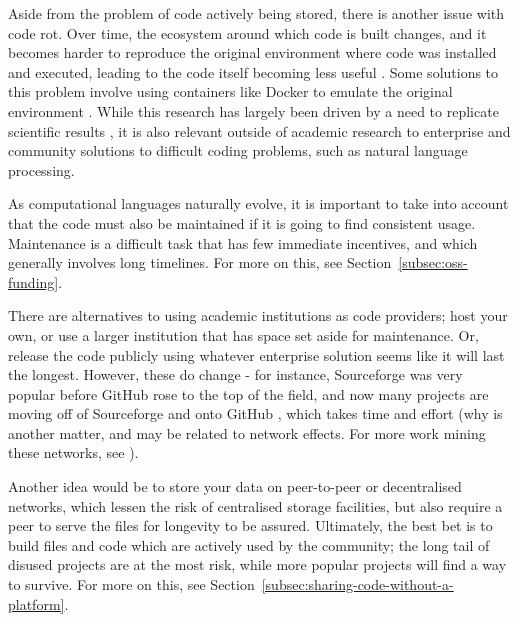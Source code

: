 Aside from the problem of code actively being stored, there is another issue with code rot. Over time, the ecosystem around which code is built changes, and it becomes harder to reproduce the original environment where code was installed and executed, leading to the code itself becoming less useful \citep{eide2010toward}. Some solutions to this problem involve using containers like Docker to emulate the original environment \citep{boettiger2015introduction}. While this research has largely been driven by a need to replicate scientific results \citep{schwab2000making, barnes2010publish, ince2012case}, it is also relevant outside of academic research to enterprise and community solutions to difficult coding problems, such as natural language processing.

As computational languages naturally evolve, it is important to take into account that the code must also be maintained if it is going to find consistent usage. Maintenance is a difficult task that has few immediate incentives, and which generally involves long timelines. For more on this, see Section~\ref{subsec:oss-funding}.


There are alternatives to using academic institutions as code providers; host your own, or use a larger institution that has space set aside for maintenance. Or, release the code publicly using whatever enterprise solution seems like it will last the longest. However, these do change - for instance, Sourceforge was very popular before GitHub rose to the top of the field, and now many projects are moving off of Sourceforge and onto GitHub \citep{finley2011github}, which takes time and effort (why is another matter, and may be related to network effects. For more work mining these networks, see \citet{thung2013network, kalliamvakou2014promises}).

Another idea would be to store your data on peer-to-peer or decentralised networks, which lessen the risk of centralised storage facilities, but also require a peer to serve the files for longevity to be assured. Ultimately, the best bet is to build files and code which are actively used by the community; the long tail of disused projects are at the most risk, while more popular projects will find a way to survive. For more on this, see Section~\ref{subsec:sharing-code-without-a-platform}.


